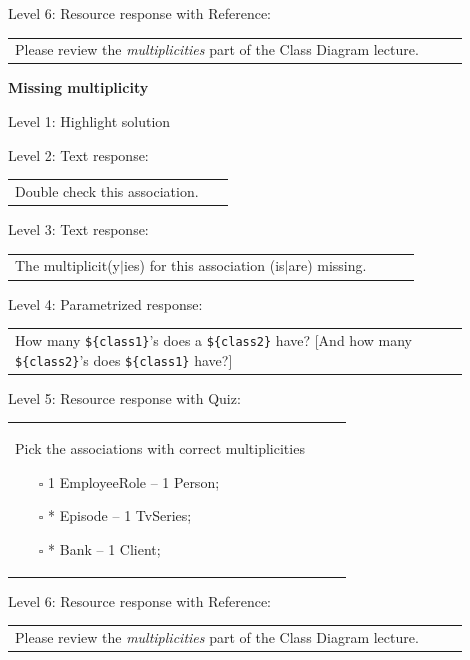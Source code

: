 \noindent Level 6: Resource response with Reference: \medskip

\begin{tabular}{|p{0.9\linewidth}}
Please review the \textit{multiplicities} part of the Class Diagram lecture.
\end{tabular} \medskip


\noindent \textbf{Missing multiplicity} \medskip

\noindent Level 1: Highlight solution  \medskip

\noindent Level 2: Text response: \medskip

\begin{tabular}{|p{0.9\linewidth}}
Double check this association.
\end{tabular} \medskip

\noindent Level 3: Text response: \medskip

\begin{tabular}{|p{0.9\linewidth}}
The multiplicit(y$|$ies) for this association (is$|$are) missing.
\end{tabular} \medskip

\noindent Level 4: Parametrized response: \medskip

\begin{tabular}{|p{0.9\linewidth}}
How many \verb|${class1}|'s does a \verb|${class2}| have? [And how many \verb|${class2}|'s does \verb|${class1}| have?]
\end{tabular} \medskip

\noindent Level 5: Resource response with Quiz: \medskip

\begin{tabular}{|p{0.9\linewidth}}
Pick the associations with correct multiplicities

\begin{itemize}
    \item[$\square$] 1 EmployeeRole -- 1 Person;
    \item[$\square$] * Episode -- 1 TvSeries;
    \item[$\square$] * Bank -- 1 Client;
\end{itemize}

\end{tabular} \medskip

\noindent Level 6: Resource response with Reference: \medskip

\begin{tabular}{|p{0.9\linewidth}}
Please review the \textit{multiplicities} part of the Class Diagram lecture.
\end{tabular} \medskip


